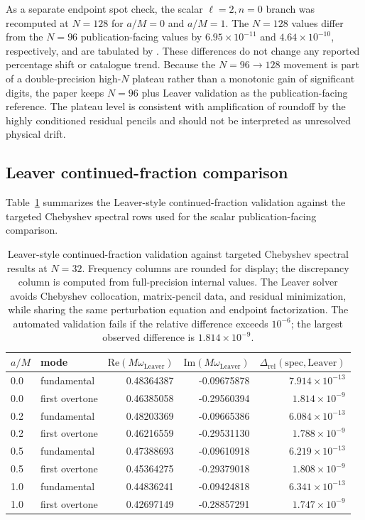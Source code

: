 ﻿\documentclass[12pt,a4paper]{article}
\begin{document}
As a separate endpoint spot check, the scalar \(\ell=2,n=0\) branch was recomputed at \(N=128\) for \(a/M=0\) and \(a/M=1\). The \(N=128\) values differ from the \(N=96\) publication-facing values by \(6.95\times10^{-11}\) and \(4.64\times10^{-10}\), respectively, and are tabulated by . These differences do not change any reported percentage shift or catalogue trend. Because the \(N=96\to128\) movement is part of a double-precision high-\(N\) plateau rather than a monotonic gain of significant digits, the paper keeps \(N=96\) plus Leaver validation as the publication-facing reference. The plateau level is consistent with amplification of roundoff by the highly conditioned residual pencils and should not be interpreted as unresolved physical drift.

\subsection{Leaver continued-fraction comparison}

Table~\ref{tab:leavercomparison} summarizes the Leaver-style continued-fraction validation against the targeted Chebyshev spectral rows used for the scalar publication-facing comparison.

\begin{table}[H]
\centering
\footnotesize
\renewcommand{\arraystretch}{1.14}
\begin{tabular}{llrrr}
\toprule
\(a/M\) & mode &
\(\mathrm{Re}(M\omega_{\mathrm{Leaver}})\) &
\(\mathrm{Im}(M\omega_{\mathrm{Leaver}})\) &
\(\Delta_{\mathrm{rel}}(\mathrm{spec},\mathrm{Leaver})\)\\
\midrule
0.0 & fundamental & 0.48364387 & -0.09675878 & \(7.914\times10^{-13}\)\\
0.0 & first overtone & 0.46385058 & -0.29560394 & \(1.814\times10^{-9}\)\\
0.2 & fundamental & 0.48203369 & -0.09665386 & \(6.084\times10^{-13}\)\\
0.2 & first overtone & 0.46216559 & -0.29531130 & \(1.788\times10^{-9}\)\\
0.5 & fundamental & 0.47388693 & -0.09610918 & \(6.219\times10^{-13}\)\\
0.5 & first overtone & 0.45364275 & -0.29379018 & \(1.808\times10^{-9}\)\\
1.0 & fundamental & 0.44836241 & -0.09424818 & \(6.341\times10^{-13}\)\\
1.0 & first overtone & 0.42697149 & -0.28857291 & \(1.747\times10^{-9}\)\\
\bottomrule
\end{tabular}
\caption{Leaver-style continued-fraction validation against targeted Chebyshev spectral results at \(N=32\). Frequency columns are rounded for display; the discrepancy column is computed from full-precision internal values. The Leaver solver avoids Chebyshev collocation, matrix-pencil data, and residual minimization, while sharing the same perturbation equation and endpoint factorization. The automated validation fails if the relative difference exceeds \(10^{-6}\); the largest observed difference is \(1.814\times10^{-9}\).}
\label{tab:leavercomparison}
\end{table}
\end{document}
